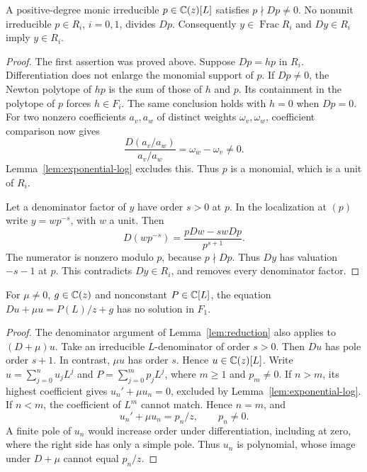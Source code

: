 \begin{lemma}\label{lem:reduction}
A positive-degree monic irreducible $p\in\mathbb{C}(z)[L]$ satisfies
$p\nmid Dp\ne0$. No nonunit irreducible $p\in R_i$, $i=0,1$, divides
$Dp$. Consequently $y\in\operatorname{Frac}R_i$ and $Dy\in R_i$
imply $y\in R_i$.
\end{lemma}
\begin{proof}
The first assertion was proved above. Suppose $Dp=hp$ in $R_i$.
Differentiation does not enlarge the monomial support of $p$.
If $Dp\ne0$, the Newton polytope of $hp$ is the sum of those of $h$
and $p$. Its containment in the polytope of $p$ forces $h\in F_i$.
The same conclusion holds with $h=0$ when $Dp=0$.
For two nonzero coefficients $a_v,a_w$ of distinct weights
$\omega_v,\omega_w$, coefficient comparison now gives
\[
 \frac{D(a_v/a_w)}{a_v/a_w}=\omega_w-\omega_v\ne0.
\]
Lemma~\ref{lem:exponential-log} excludes this. Thus $p$ is a monomial,
which is a unit of $R_i$.

Let a denominator factor of $y$ have order $s>0$ at $p$.
In the localization at $(p)$ write $y=wp^{-s}$, with $w$ a unit. Then
\[
 D(wp^{-s})=\frac{pDw-swDp}{p^{s+1}}.
\]
The numerator is nonzero modulo $p$, because $p\nmid Dp$.
Thus $Dy$ has valuation $-s-1$ at $p$. This contradicts $Dy\in R_i$,
and removes every denominator factor.
\end{proof}

\begin{lemma}\label{lem:twisted-obstruction}
For $\mu\ne0$, $g\in\mathbb{C}(z)$ and nonconstant $P\in\mathbb{C}[L]$, the equation
$Du+\mu u=P(L)/z+g$ has no solution in $F_1$.
\end{lemma}
\begin{proof}
The denominator argument of Lemma~\ref{lem:reduction} also applies to $(D+\mu)u$. Take an irreducible $L$-denominator of order $s>0$. Then $Du$ has pole order $s+1$. In contrast, $\mu u$ has order $s$.
Hence $u\in\mathbb{C}(z)[L]$. Write $u=\sum_{j=0}^nu_jL^j$ and
$P=\sum_{j=0}^mp_jL^j$, where $m\ge1$ and $p_m\ne0$.
If $n>m$, its highest coefficient gives $u_n'+\mu u_n=0$,
excluded by Lemma~\ref{lem:exponential-log}. If $n<m$, the coefficient
of $L^m$ cannot match. Hence $n=m$, and
\[
 u_n'+\mu u_n=p_n/z,\qquad p_n\ne0.
\]
A finite pole of $u_n$ would increase order under differentiation,
including at zero, where the right side has only a simple pole.
Thus $u_n$ is polynomial, whose image under $D+\mu$ cannot equal $p_n/z$.
\end{proof}

